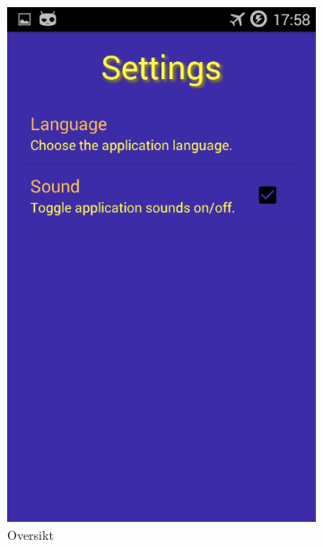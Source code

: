 \begin{figure}[ht]
    \centering
    \begin{subfigure}[b]{0.25\textwidth}
        \includegraphics[width=\textwidth]{./img/bruksanvisning/7.png}
        \caption{Oversikt}
        \label{fig:innstllinger_oversikt}
    \end{subfigure}
    \begin{subfigure}[b]{0.25\textwidth}

\end{subfigure}
\end{figure}
